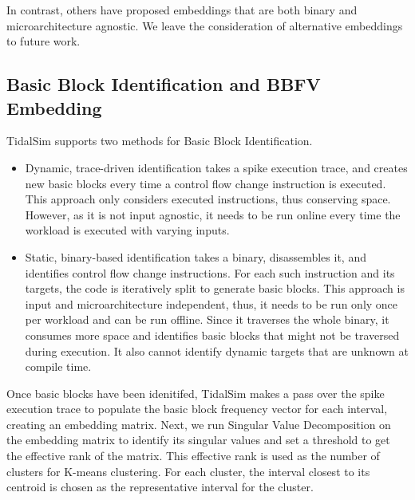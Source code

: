 \documentclass[sigplan,nonacm,10pt]{acmart}
\begin{document}
In contrast, others have proposed embeddings that are both binary and microarchitecture agnostic\cite{nps}.
We leave the consideration of alternative embeddings to future work.


\subsection{Basic Block Identification and BBFV Embedding}




TidalSim supports two methods for Basic Block Identification.
\begin{itemize}
  \item Dynamic, trace-driven identification takes a spike execution trace, and creates new basic blocks every time a control flow change instruction is executed.
  This approach only considers executed instructions, thus conserving space. However, as it is not input agnostic, it needs to be run online every time the workload is executed with varying inputs.
  \item Static, binary-based identification takes a binary, disassembles it, and identifies control flow change instructions. For each such instruction and its targets, the code is iteratively split to generate basic blocks.
  This approach is input and microarchitecture independent, thus, it needs to be run only once per workload and can be run offline. Since it traverses the whole binary, it consumes more space and identifies basic blocks that might not be traversed during execution. It also cannot identify dynamic targets that are unknown at compile time.
\end{itemize}

Once basic blocks have been idenitifed, TidalSim makes a pass over the spike execution trace to populate the basic block frequency vector for each interval, creating an embedding matrix. Next, we run Singular Value Decomposition on the embedding matrix to identify its singular values and set a threshold to get the effective rank of the matrix. This effective rank is used as the number of clusters for K-means clustering.
For each cluster, the interval closest to its centroid is chosen as the representative interval for the cluster.
\end{document}
